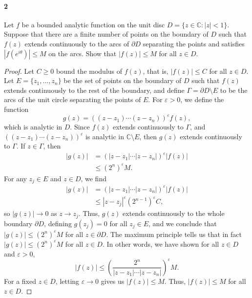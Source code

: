 \documentclass[12pt]{article}
\newenvironment{fullbox}{\begin{lrbox}{\savefullbox}\begin{minipage}{\dimexpr\textwidth-2\fboxsep\relax}}{\end{minipage}\end{lrbox}\begin{center}\framebox[\textwidth]{\usebox{\savefullbox}}\end{center}}
\newenvironment{pbox}[1][]{\begin{fullbox}\ifx#1\empty\else\paragraph{#1}\fi}{\end{fullbox}}
\theoremstyle{definition}
\newcommand{\C}{\mathbb{C}}
\newcommand{\eps}{\varepsilon}
\newcommand{\pfrac}[2]{\left(\frac{#1}{#2}\right)}
\newcommand{\bd}{\partial}
\begin{document}
\newpage
\begin{pbox}[2]
    Let $f$ be a bounded analytic function on the unit disc $D = \{z \in \C : |z| < 1\}$. Suppose that there are a finite number of points on the boundary of $D$ such that $f(z)$ extends continuously to the arcs of $\bd D$ separating the points and satisfies $|f(e^{i\theta})| \leq M$ on the arcs. Show that $|f(z)| \leq M$ for all $z \in D$.
\end{pbox}

\begin{proof}
    Let $C \geq 0$ bound the modulus of $f(z)$, that is, $|f(z)| \leq C$ for all $z \in D$. Let $E = \{z_1, \dots, z_n\}$ be the set of points on the boundary of $D$ such that $f(z)$ extends continuously to the rest of the boundary, and define $\Gamma = \bd D \setminus E$ to be the arcs of the unit circle separating the points of $E$. For $\eps > 0$, we define the function
    \[
        g(z) = ((z - z_1) \cdots (z - z_n))^\eps f(z),
    \]
    which is analytic in $D$. Since $f(z)$ extends continuously to $\Gamma$, and $((z - z_1) \cdots (z - z_n))^\eps$ is analytic in $\C \setminus E$, then $g(z)$ extends continuously to $\Gamma$. If $z \in \Gamma$, then
    \begin{align*}
        |g(z)|
            &= (|z - z_1| \cdots |z - z_n|)^\eps |f(z)| \\
            & \leq (2^n)^\eps M.
    \end{align*}
    For any $z_j \in E$ and $z \in D$, we find
    \begin{align*}
        |g(z)| 
            &= (|z - z_1| \cdots |z - z_n|)^\eps |f(z)| \\
            &\leq |z - z_j|^\eps(2^{n-1})^\eps C,
    \end{align*}
    so $|g(z)| \to 0$ as $z \to z_j$. Thus, $g(z)$ extends continuously to the whole boundary $\bd D$, defining $g(z_j) = 0$ for all $z_j \in E$, and we conclude that $|g(z)| \leq (2^n)^\eps M$ for all $z \in \bd D$. The maximum principle tells us that in fact $|g(z)| \leq (2^n)^\eps M$ for all $z \in D$. In other words, we have shown for all $z \in D$ and $\eps > 0$,
    \[
        |f(z)| \leq \pfrac{2^n}{|z-z_1|\cdots|z-z_n|}^\eps M.
    \]
    For a fixed $z \in D$, letting $\eps \to 0$ gives us $|f(z)| \leq M$. Thus, $|f(z)| \leq M$ for all $z \in D$.
    
    
    
    
\end{proof}
\end{document}
